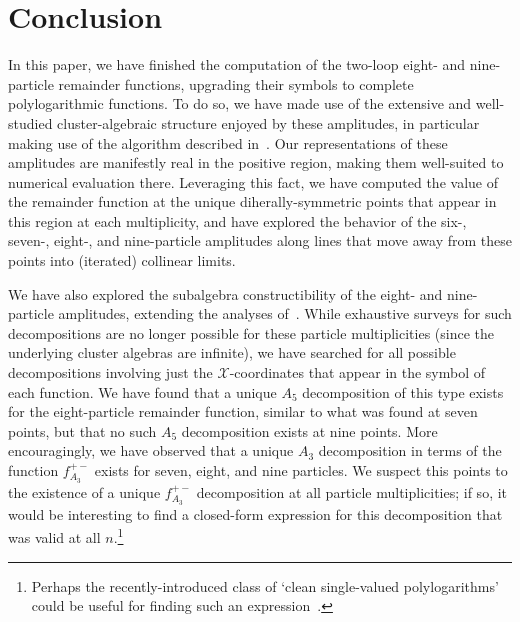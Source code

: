 \documentclass[11pt]{article}
\def\x{\mathcal{X}}
\begin{document}
\section{Conclusion}

In this paper, we have finished the computation of the two-loop eight- and nine-particle remainder functions, upgrading their symbols to complete polylogarithmic functions. To do so, we have made use of the extensive and well-studied cluster-algebraic structure enjoyed by these amplitudes, in particular making use of the algorithm described in~\cite{Golden:2014xqf}. Our representations of these amplitudes are manifestly real in the positive region, making them well-suited to numerical evaluation there. Leveraging this fact, we have computed the value of the remainder function at the unique diherally-symmetric points that appear in this region at each multiplicity, and have explored the behavior of the six-, seven-, eight-, and nine-particle amplitudes along lines that move away from these points into (iterated) collinear limits.

We have also explored the subalgebra constructibility of the eight- and nine-particle amplitudes, extending the analyses of~\cite{Golden:2014xqa,Golden:2018gtk}. While exhaustive surveys for such decompositions are no longer possible for these particle multiplicities (since the underlying cluster algebras are infinite), we have searched for all possible decompositions involving just the $\x$-coordinates that appear in the symbol of each function. We have found that a unique $A_5$ decomposition of this type exists for the eight-particle remainder function, similar to what was found at seven points, but that no such $A_5$ decomposition exists at nine points. More encouragingly, we have observed that a unique $A_3$ decomposition in terms of the function $f_{A_3}^{+-}$ exists for seven, eight, and nine particles. We suspect this points to the existence of a unique $f_{A_3}^{+-}$ decomposition at all particle multiplicities; if so, it would be interesting to find a closed-form expression for this decomposition that was valid at all $n$.\footnote{Perhaps the recently-introduced class of `clean single-valued polylogarithms' could be useful for finding such an expression~\cite{Charlton:2021uhu}.}
\end{document}
